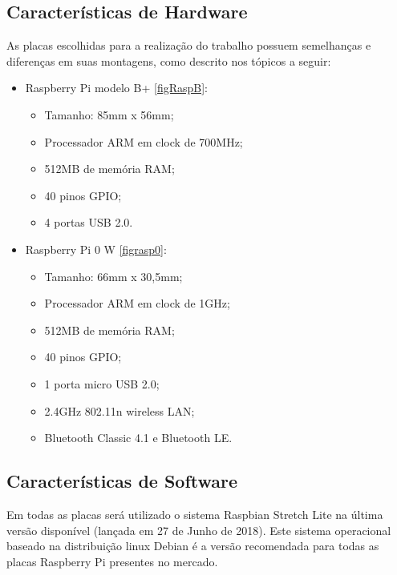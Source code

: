 \subsection{Características de Hardware}
\quad As placas escolhidas para a realização do trabalho possuem semelhanças e diferenças em suas montagens, como descrito nos tópicos a seguir:
\begin{itemize}
  \item Raspberry Pi modelo B+ \ref{figRaspB}:
  \begin{itemize}
    \item Tamanho: 85mm x 56mm;
    \item Processador ARM em clock de 700MHz;
    \item 512MB de memória RAM;
    \item 40 pinos GPIO;
    \item 4 portas USB 2.0.
  \end{itemize}
  \item Raspberry Pi 0 W \ref{figrasp0}:
  \begin{itemize}
    \item Tamanho: 66mm x 30,5mm;
    \item Processador ARM em clock de 1GHz;
    \item 512MB de memória RAM;
    \item 40 pinos GPIO;
    \item 1 porta micro USB 2.0;
    \item 2.4GHz 802.11n wireless LAN;
    \item Bluetooth Classic 4.1 e Bluetooth LE.
  \end{itemize}
\end{itemize}
\subsection{Características de Software}
\quad Em todas as placas será utilizado o sistema Raspbian Stretch Lite na última versão disponível (lançada em 27 de Junho de 2018).
Este sistema operacional baseado na distribuição linux Debian é a versão recomendada para todas as placas Raspberry Pi presentes no mercado.
